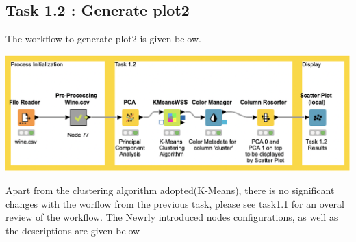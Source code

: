 \documentclass[11pt]{article}
\begin{document}
		\subsection*{Task 1.2 : Generate plot2}
			The workflow to generate plot2 is given below.
			\iftrue
			\begin{center}
				\includegraphics[scale=0.35]{res/t1/t12/t12-workflow}
			\end{center}
			\fi
			Apart from the clustering algorithm adopted(K-Means), there is no significant changes with the worflow from the previous task, please see task1.1 for an overal review of the workflow. The Newrly introduced nodes configurations, as well as the descriptions are given below
			
\end{document}
